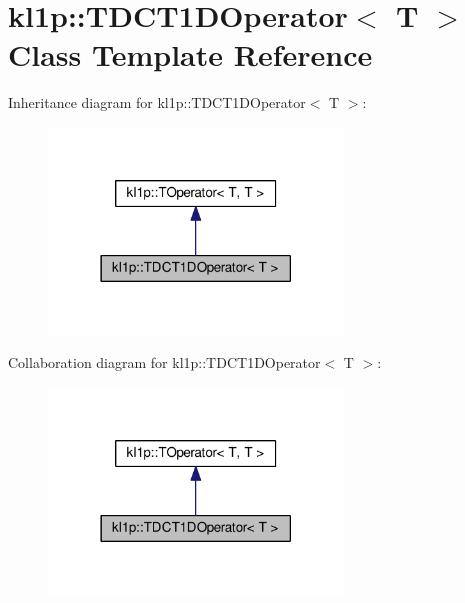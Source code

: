 \hypertarget{classkl1p_1_1TDCT1DOperator}{}\section{kl1p\+:\+:T\+D\+C\+T1\+D\+Operator$<$ T $>$ Class Template Reference}
\label{classkl1p_1_1TDCT1DOperator}


Inheritance diagram for kl1p\+:\+:T\+D\+C\+T1\+D\+Operator$<$ T $>$\+:
\nopagebreak
\begin{figure}[H]
\begin{center}
\leavevmode
\includegraphics[width=222pt]{classkl1p_1_1TDCT1DOperator__inherit__graph}
\end{center}
\end{figure}


Collaboration diagram for kl1p\+:\+:T\+D\+C\+T1\+D\+Operator$<$ T $>$\+:
\nopagebreak
\begin{figure}[H]
\begin{center}
\leavevmode
\includegraphics[width=222pt]{classkl1p_1_1TDCT1DOperator__coll__graph}
\end{center}
\end{figure}
